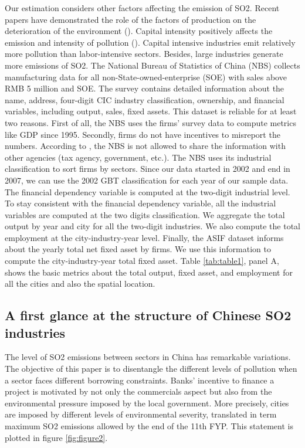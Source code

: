 \documentclass[12pt]{article}
\begin{document}
Our estimation considers other factors affecting the emission of SO2. Recent papers have demonstrated the role of the factors of production on the deterioration of the environment (\cite{Cole2003-ad, Cole2008-pj}). Capital intensity positively affects the emission and intensity of pollution (\cite{Hering2014-af, Andersen2017-wf}). Capital intensive industries emit relatively more pollution than labor-intensive sectors. Besides, large industries generate more emissions of SO2. The National Bureau of Statistics of China (NBS) collects manufacturing data for all non-State-owned-enterprise (SOE) with sales above RMB 5 million and SOE. The survey contains detailed information about the name, address, four-digit CIC industry classification, ownership, and financial variables, including output, sales, fixed assets. This dataset is reliable for at least two reasons. First of all, the NBS uses the firms’ survey data to compute metrics like GDP since 1995. Secondly, firms do not have incentives to misreport the numbers. According to \cite{Chen2018-ki}, the NBS is not allowed to share the information with other agencies (tax agency, government, etc.). The NBS uses its industrial classification to sort firms by sectors. Since our data started in 2002 and end in 2007, we can use the 2002 GBT classification for each year of our sample data. The financial dependency variable is computed at the two-digit industrial level. To stay consistent with the financial dependency variable, all the industrial variables are computed at the two digits classification.  We aggregate the total output by year and city for all the two-digit industries. We also compute the total employment at the city-industry-year level. Finally, the ASIF dataset informs about the yearly total net fixed asset by firms. We use this information to compute the city-industry-year total fixed asset. Table \ref{tab:table1}, panel A,  shows the basic metrics about the total output, fixed asset, and employment for all the cities and also the spatial location.

\subsection{A first glance at the structure of Chinese SO2 industries}

The level of SO2 emissions between sectors in China has remarkable variations. The objective of this paper is to disentangle the different levels of pollution when a sector faces different borrowing constraints. Banks' incentive to finance a project is motivated by not only the commercials aspect but also from the environmental pressure imposed by the local government. More precisely, cities are imposed by different levels of environmental severity, translated in term maximum SO2 emissions allowed by the end of the 11th FYP. This statement is plotted in figure \ref{fig:figure2}.
\end{document}
